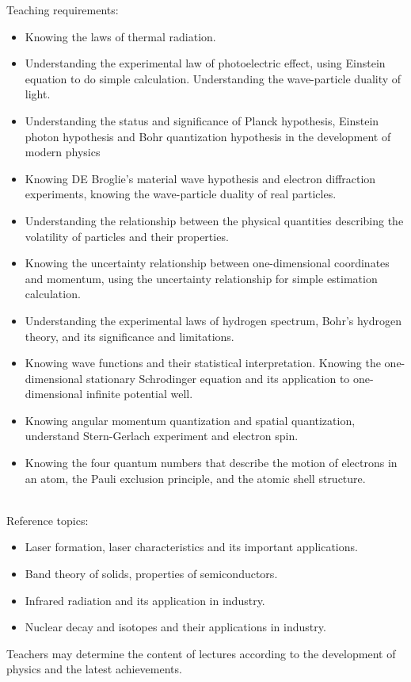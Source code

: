 \documentclass[10pt,a4paper,oneside]{article}
\begin{document}
Teaching requirements:
\begin{itemize}
	\item Knowing  the laws of thermal radiation.
	\item Understanding the experimental law of photoelectric effect, using Einstein equation to do simple calculation. Understanding the wave-particle duality of light.
	\item Understanding the status and significance of Planck hypothesis, Einstein photon hypothesis and Bohr quantization hypothesis in the development of modern physics
	\item Knowing DE Broglie's material wave hypothesis and electron diffraction experiments, knowing the wave-particle duality of real particles.
	\item Understanding the relationship between the physical quantities describing the volatility of particles and their properties.
	\item Knowing the uncertainty relationship between one-dimensional coordinates and momentum,  using the uncertainty relationship for simple estimation calculation.
	\item Understanding the experimental laws of hydrogen spectrum, Bohr's hydrogen theory, and its significance and limitations.
	\item Knowing wave functions and their statistical interpretation. Knowing the one-dimensional stationary Schrodinger equation and its application to one-dimensional infinite potential well.
	\item Knowing angular momentum quantization and spatial quantization, understand Stern-Gerlach experiment and electron spin.
	\item Knowing the four quantum numbers that describe the motion of electrons in an atom, the Pauli exclusion principle, and the atomic shell structure.
\end{itemize}
\\
Reference topics:
\begin{itemize}
	\item Laser formation, laser characteristics and its important applications.
	\item Band theory of solids, properties of semiconductors.
	\item Infrared radiation and its application in industry.
	\item Nuclear decay and isotopes and their applications in industry.
\end{itemize}
Teachers may determine the content of lectures according to the development of physics and the latest achievements.
\end{document}

